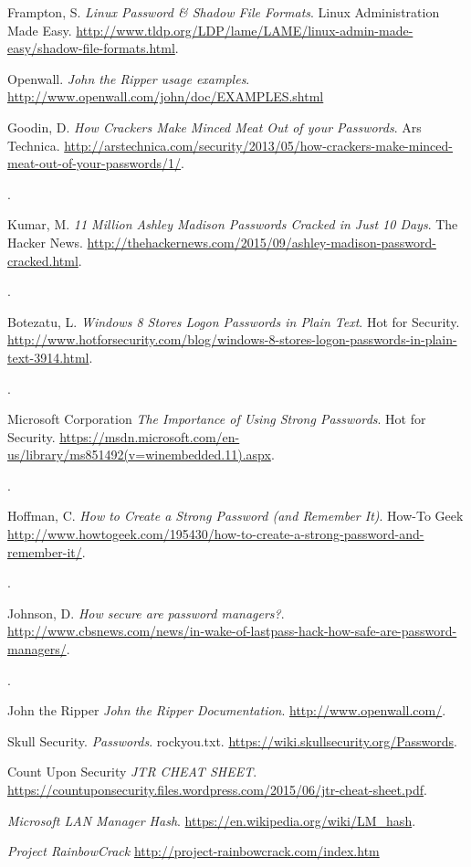 \documentclass[12pt]{extarticle}
\begin{document}
\begin{thebibliography}{9}

	Frampton, S.
	\textit{Linux Password \& Shadow File Formats}.
	Linux Administration Made Easy.
	\url{http://www.tldp.org/LDP/lame/LAME/linux-admin-made-easy/shadow-file-formats.html}.

	Openwall.
	\textit{John the Ripper usage examples}.
	\url{http://www.openwall.com/john/doc/EXAMPLES.shtml}
	
Goodin, D.
\textit{How Crackers Make Minced Meat Out of your Passwords}.
Ars Technica.
\url{http://arstechnica.com/security/2013/05/how-crackers-make-minced-meat-out-of-your-passwords/1/}.
\date{May 2013}.

Kumar, M.
\textit{11 Million Ashley Madison Passwords Cracked in Just 10 Days}.
The Hacker News.
\url{http://thehackernews.com/2015/09/ashley-madison-password-cracked.html}.
\date{Sept 2015}.

Botezatu, L.
\textit{Windows 8 Stores Logon Passwords in Plain Text}.
Hot for Security.
\url{http://www.hotforsecurity.com/blog/windows-8-stores-logon-passwords-in-plain-text-3914.html}.
\date{Oct 2015}.

Microsoft Corporation
\textit{The Importance of Using Strong Passwords}.
Hot for Security.
\url{https://msdn.microsoft.com/en-us/library/ms851492(v=winembedded.11).aspx}.
\date{2006}.

Hoffman, C.
\textit{How to Create a Strong Password (and Remember It)}.
How-To Geek
\url{http://www.howtogeek.com/195430/how-to-create-a-strong-password-and-remember-it/}.
\date{May 2015}.

Johnson, D.
\textit{How secure are password managers?}.
\url{http://www.cbsnews.com/news/in-wake-of-lastpass-hack-how-safe-are-password-managers/}.
\date{June 2015}.

John the Ripper
\textit{John the Ripper Documentation}.
\url{http://www.openwall.com/}.

Skull Security.
\textit{Passwords}.
rockyou.txt.
\url{https://wiki.skullsecurity.org/Passwords}.

Count Upon Security
\textit{JTR CHEAT SHEET}.
\url{https://countuponsecurity.files.wordpress.com/2015/06/jtr-cheat-sheet.pdf}.

\textit{Microsoft LAN Manager Hash}.
\url{https://en.wikipedia.org/wiki/LM_hash}.

\textit{Project RainbowCrack}
\url{http://project-rainbowcrack.com/index.htm}

\end{thebibliography}
\end{document}
